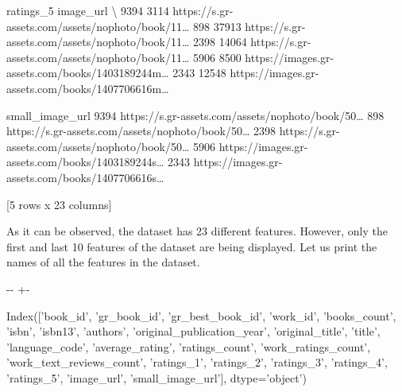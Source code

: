 \documentclass[letterpaper,10pt,english]{sphinxmanual}
\newlength\nbsphinxcodecellspacing
\begin{document}
{\begin{sphinxVerbatim}[commandchars=\\\{\}]
      ratings\_5                                          image\_url  \textbackslash{}
9394       3114  https://s.gr-assets.com/assets/nophoto/book/11{\ldots}
898       37913  https://s.gr-assets.com/assets/nophoto/book/11{\ldots}
2398      14064  https://s.gr-assets.com/assets/nophoto/book/11{\ldots}
5906       8500  https://images.gr-assets.com/books/1403189244m{\ldots}
2343      12548  https://images.gr-assets.com/books/1407706616m{\ldots}

                                        small\_image\_url
9394  https://s.gr-assets.com/assets/nophoto/book/50{\ldots}
898   https://s.gr-assets.com/assets/nophoto/book/50{\ldots}
2398  https://s.gr-assets.com/assets/nophoto/book/50{\ldots}
5906  https://images.gr-assets.com/books/1403189244s{\ldots}
2343  https://images.gr-assets.com/books/1407706616s{\ldots}

[5 rows x 23 columns]
\end{sphinxVerbatim}
}

As it can be observed, the dataset has 23 different features. However, only the first and last 10 features of the dataset are being displayed. Let us print the names of all the features in the dataset.

{
\begin{sphinxVerbatim}[commandchars=\\\{\}]
\llap{\color{nbsphinxin}[10]:\,\hspace{\fboxrule}\hspace{\fboxsep}}
\end{sphinxVerbatim}
}

{

\kern-\sphinxverbatimsmallskipamount\kern-\baselineskip
\kern+\FrameHeightAdjust\kern-\fboxrule
\vspace{\nbsphinxcodecellspacing}

\begin{sphinxVerbatim}[commandchars=\\\{\}]
\llap{\color{nbsphinxout}[10]:\,\hspace{\fboxrule}\hspace{\fboxsep}}Index(['book\_id', 'gr\_book\_id', 'gr\_best\_book\_id', 'work\_id', 'books\_count',
       'isbn', 'isbn13', 'authors', 'original\_publication\_year',
       'original\_title', 'title', 'language\_code', 'average\_rating',
       'ratings\_count', 'work\_ratings\_count', 'work\_text\_reviews\_count',
       'ratings\_1', 'ratings\_2', 'ratings\_3', 'ratings\_4', 'ratings\_5',
       'image\_url', 'small\_image\_url'],
      dtype='object')
\end{sphinxVerbatim}
}
\end{document}
